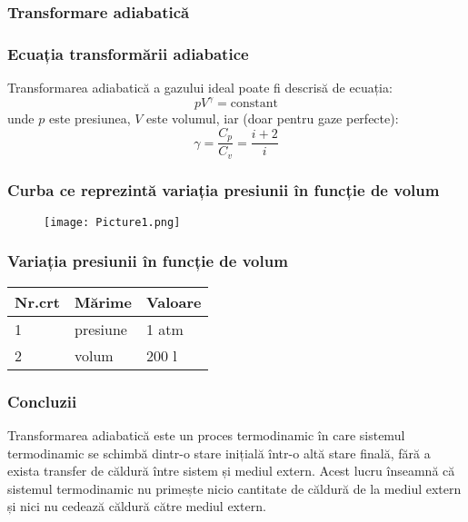 \documentclass{beamer}
\begin{document}
\begin{frame}
\frametitle{Transformare adiabatică}
\end{frame}

\begin{frame}
\frametitle{Ecuația transformării adiabatice}
Transformarea adiabatică a gazului ideal poate fi descrisă de ecuația:
\begin{equation}
pV^{\gamma} = \text{constant}
\end{equation}
unde $p$ este presiunea, $V$ este volumul, iar (doar pentru gaze perfecte):
\begin{equation}
\gamma = \frac{C_p}{C_v} = \frac{i+2}{i}
\end{equation}
\end{frame}

\begin{frame}
\frametitle{Curba ce reprezintă variația presiunii în funcție de volum}
\begin{figure}
\texttt{[image: Picture1.png]}
\end{figure}
\end{frame}

\begin{frame}
\frametitle{Variația presiunii în funcție de volum}
\begin{tabular}{|l|l|l|} \hline
Nr.crt & Mărime & Valoare  \\ \hline
1 & presiune & 1 atm  \\ \hline
2 & volum & 200 l  \\ \hline
\end{tabular}
\end{frame}
\begin{frame}
\frametitle{Concluzii}
Transformarea adiabatică este un proces termodinamic în care sistemul termodinamic se schimbă dintr-o stare inițială într-o altă stare finală, fără a exista transfer de căldură între sistem și mediul extern. Acest lucru înseamnă că sistemul termodinamic nu primește nicio cantitate de căldură de la mediul extern și nici nu cedează căldură către mediul extern.

\end{frame}
\end{document}
